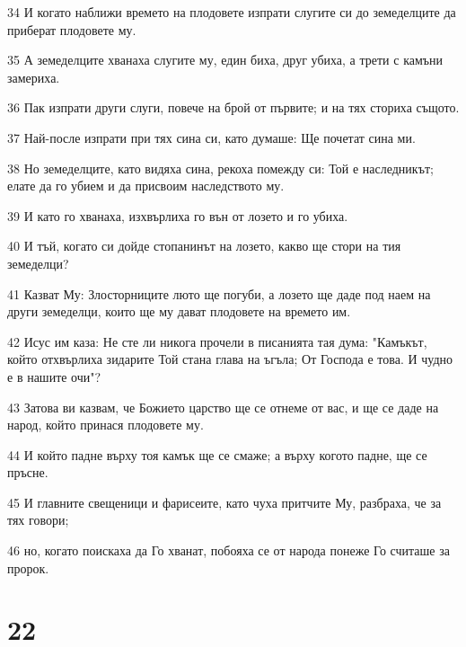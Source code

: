\par 34 И когато наближи времето на плодовете изпрати слугите си до земеделците да приберат плодовете му.
\par 35 А земеделците хванаха слугите му, един биха, друг убиха, а трети с камъни замериха.
\par 36 Пак изпрати други слуги, повече на брой от първите; и на тях сториха същото.
\par 37 Най-после изпрати при тях сина си, като думаше: Ще почетат сина ми.
\par 38 Но земеделците, като видяха сина, рекоха помежду си: Той е наследникът; елате да го убием и да присвоим наследството му.
\par 39 И като го хванаха, изхвърлиха го вън от лозето и го убиха.
\par 40 И тъй, когато си дойде стопанинът на лозето, какво ще стори на тия земеделци?
\par 41 Казват Му: Злосторниците люто ще погуби, а лозето ще даде под наем на други земеделци, които ще му дават плодовете на времето им.
\par 42 Исус им каза: Не сте ли никога прочели в писанията тая дума: "Камъкът, който отхвърлиха зидарите Той стана глава на ъгъла; От Господа е това. И чудно е в нашите очи"?
\par 43 Затова ви казвам, че Божието царство ще се отнеме от вас, и ще се даде на народ, който принася плодовете му.
\par 44 И който падне върху тоя камък ще се смаже; а върху когото падне, ще се пръсне.
\par 45 И главните свещеници и фарисеите, като чуха притчите Му, разбраха, че за тях говори;
\par 46 но, когато поискаха да Го хванат, побояха се от народа понеже Го считаше за пророк.

\chapter{22}

